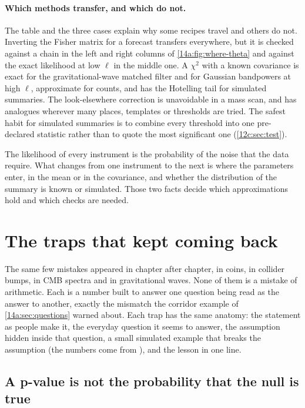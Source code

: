 \paragraph{Which methods transfer, and which do not.}
The table and the three cases explain why some recipes travel and others do not.
Inverting the Fisher matrix for a forecast transfers everywhere, but it is checked
against a chain in the left and right columns of \cref{14a:fig:where-theta} and
against the exact likelihood at low $\ell$ in the middle one. A $\chi^2$ with a known
covariance is exact for the gravitational-wave matched filter and for Gaussian
bandpowers at high $\ell$, approximate for counts, and has the Hotelling tail for
simulated summaries. The look-elsewhere correction is unavoidable in a mass scan, and
has analogues wherever many places, templates or thresholds are tried. The safest habit
for simulated summaries is to combine every threshold into one pre-declared statistic
rather than to quote the most significant one (\cref{12c:sec:test}).

\begin{keyidea}
The likelihood of every instrument is the probability of the noise that the data
require. What changes from one instrument to the next is where the parameters enter,
in the mean or in the covariance, and whether the distribution of the summary is known
or simulated. Those two facts decide which approximations hold and which checks are
needed.
\end{keyidea}
\section{The traps that kept coming back}\label{14a:sec:pitfalls}

The same few mistakes appeared in chapter after chapter, in coins, in collider bumps,
in CMB spectra and in gravitational waves. None of them is a mistake of arithmetic.
Each is a number built to answer one question being read as the answer to another,
exactly the mismatch the corridor example of \cref{14a:sec:questions} warned about.
Each trap has the same anatomy: the statement as people make it, the
everyday question it seems to answer, the assumption hidden inside that question, a
small simulated example that breaks the assumption (the numbers come from
), and the lesson in one line.

\subsection{A p-value is not the probability that the null is true}\label{14a:sec:pitfall-p}

